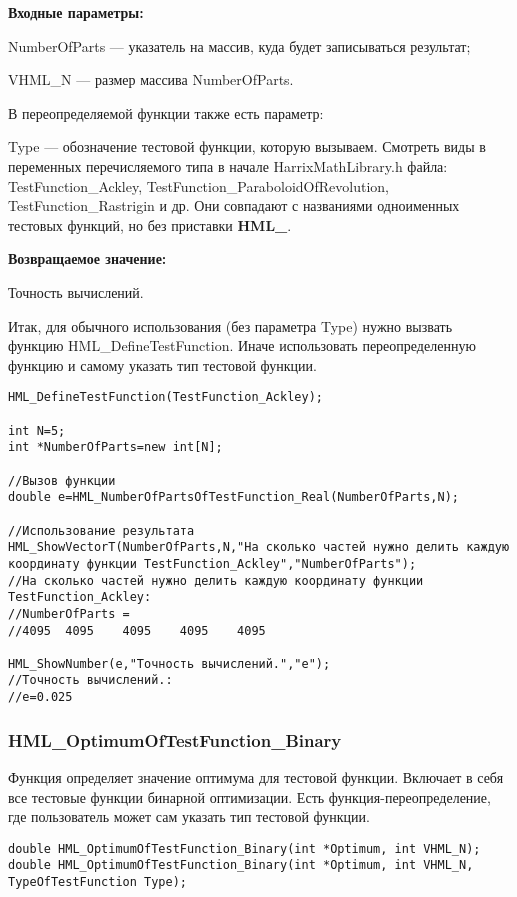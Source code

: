 \documentclass[a4paper,12pt]{article}
\begin{document}
\textbf{Входные параметры:}

NumberOfParts --- указатель на массив, куда будет записываться результат;

VHML\_N --- размер массива NumberOfParts.

В переопределяемой функции также есть параметр:
  
Type --- обозначение тестовой функции, которую вызываем.
Смотреть виды в переменных перечисляемого типа в начале HarrixMathLibrary.h файла: TestFunction\_Ackley, TestFunction\_ParaboloidOfRevolution, TestFunction\_Rastrigin и др. Они совпадают с названиями одноименных тестовых функций, но без приставки \textbf{HML\_}.

\textbf{Возвращаемое значение:}
 
Точность вычислений.

Итак, для обычного использования (без параметра Type) нужно вызвать функцию HML\_DefineTestFunction. Иначе использовать переопределенную функцию и самому указать тип тестовой функции.


\begin{lstlisting}[label=code_use_HML_NumberOfPartsOfTestFunction_Real,caption=Пример использования]
HML_DefineTestFunction(TestFunction_Ackley);

int N=5;
int *NumberOfParts=new int[N];

//Вызов функции
double e=HML_NumberOfPartsOfTestFunction_Real(NumberOfParts,N);

//Использование результата
HML_ShowVectorT(NumberOfParts,N,"На сколько частей нужно делить каждую координату функции TestFunction_Ackley","NumberOfParts");
//На сколько частей нужно делить каждую координату функции TestFunction_Ackley:
//NumberOfParts =	
//4095	4095	4095	4095	4095

HML_ShowNumber(e,"Точность вычислений.","e");
//Точность вычислений.:
//e=0.025
\end{lstlisting}

\subsubsection{HML\_OptimumOfTestFunction\_Binary}\label{HML_OptimumOfTestFunction_Binary}

Функция определяет значение оптимума для тестовой функции. Включает в себя все тестовые функции бинарной оптимизации. Есть функция-переопределение, где пользователь может сам указать тип тестовой функции.


\begin{lstlisting}[label=code_syntax_HML_OptimumOfTestFunction_Binary,caption=Синтаксис]
double HML_OptimumOfTestFunction_Binary(int *Optimum, int VHML_N);
double HML_OptimumOfTestFunction_Binary(int *Optimum, int VHML_N, TypeOfTestFunction Type);
\end{lstlisting}
\end{document}
